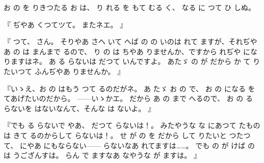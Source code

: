 お
の
を
りきつたる
お
は、
り
れる
を
もて
むる
く、
なる
に
つて
ひ
しぬ。

『
ぢやあ
くつてツて。
またネエ。
』

『
つて、
さん。
そりやあ
さへ
いて
へば
の
の
いのは
れて
ますが、それぢやあ
の
は
まんまで
るので、
り
の
は
ちやあ%
りませんか、ですから
れぢや
になりますはネ。
あ
る
らないは
だつて
いんですよ。
あたゞ
の
が
だから%
か
て
りたいつて
ふんぢやあ
りませんか。
』

『いゝえ、お
の
はもう
つて
るのだがネ。
あ
たゞ
お
の
で、
お
の
になる
を
てあげたいのだから。
{---}{---}いゝかエ。
だから
あ
の
まで
へるので、
お
の
る
らないを
はないなんて、そんな
は
ないよ。
』

『でも
る
らないで
やあ、
だつて
らないは！。
みたやうな
な
にあつて
たものは
きて
るのからして
らないは！。
せ
が
の
を
だから%
して
りたいと
つたつて、
にやあ
にもならない{---}{---}
らないなあ
れてますは……。
でも
の
が
けば
の
は
うござんすは。
らん
で
ますなあ
なやうな
が
ますは。
』

